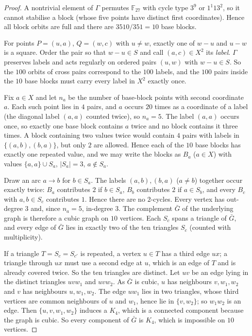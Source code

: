 \documentclass[11pt]{article}
\theoremstyle{remark}
\newcommand{\F}{\mathbb{F}}
\begin{document}
\begin{proof}
A nontrivial element of $\Gamma$ permutes $\F_{27}$ with cycle type $3^9$ or $1^1 13^2$, so it cannot
stabilise a block (whose five points have distinct first coordinates).  Hence all block orbits are
full and there are $3510/351=10$ base blocks.

For points $P=(u,a)$, $Q=(w,c)$ with $u\neq w$, exactly one of $w-u$ and $u-w$ is a square.  Order the
pair so that $w-u\in S$ and call $(a,c)\in X^2$ its \emph{label}.  $\Gamma$ preserves labels and acts
regularly on ordered pairs $(u,w)$ with $w-u\in S$.  So the $100$ orbits of cross pairs correspond to
the $100$ labels, and the $100$ pairs inside the $10$ base blocks must carry every label in $X^2$
exactly once.

Fix $a\in X$ and let $n_a$ be the number of base-block points with second coordinate $a$.  Each such
point lies in $4$ pairs, and $a$ occurs $20$ times as a coordinate of a label (the diagonal label
$(a,a)$ counted twice), so $n_a=5$.  The label $(a,a)$ occurs once, so exactly one base block contains
$a$ twice and no block contains it three times.  A block containing two values twice would contain $4$
pairs with labels in $\{(a,b),(b,a)\}$, but only $2$ are allowed.  Hence each of the $10$ base blocks
has exactly one repeated value, and we may write the blocks as $B_a$ ($a\in X$) with values
$\{a,a\}\cup S_a$, $|S_a|=3$, $a\notin S_a$.

Draw an arc $a\to b$ for $b\in S_a$.  The labels $(a,b),(b,a)$ ($a\neq b$) together occur exactly twice:
$B_a$ contributes $2$ if $b\in S_a$, $B_b$ contributes $2$ if $a\in S_b$, and every $B_c$ with
$a,b\in S_c$ contributes $1$.  Hence there are no $2$-cycles.  Every vertex has out-degree $3$ and, since
$n_a=5$, in-degree $3$.  The complement $\bar G$ of the underlying graph is therefore a cubic graph on
$10$ vertices.  Each $S_c$ spans a triangle of $\bar G$, and every edge of $\bar G$ lies in exactly two
of the ten triangles $S_c$ (counted with multiplicity).

If a triangle $T=S_c=S_{c'}$ is repeated, a vertex $u\in T$ has a third edge $ux$; a triangle through
$ux$ must use a second edge at $u$, which is an edge of $T$ and is already covered twice.  So the ten
triangles are distinct.  Let $uv$ be an edge lying in the distinct triangles $uvw_1$ and $uvw_2$.  As
$\bar G$ is cubic, $u$ has neighbours $v,w_1,w_2$ and $v$ has neighbours $u,w_1,w_2$.  The edge $uw_1$
lies in two triangles, whose third vertices are common neighbours of $u$ and $w_1$, hence lie in
$\{v,w_2\}$; so $w_1w_2$ is an edge.  Then $\{u,v,w_1,w_2\}$ induces a $K_4$, which is a connected
component because the graph is cubic.  So every component of $\bar G$ is $K_4$, which is impossible on
$10$ vertices.
\end{proof}
\end{document}
